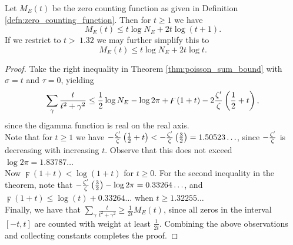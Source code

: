 \begin{corollary}[GRH]\label{cor:zero_density}
Let $M_E(t)$ be the zero counting function as given in Definition \ref{defn:zero_counting_function}. Then for $t \ge 1$ we have
\begin{equation}
M_E(t) \le t\log N_E +2t\log(t+1).
\end{equation}
If we restrict to $t>~1.32$ we may further simplify this to
\begin{equation}
M_E(t) \le t\log N_E +2t\log t.
\end{equation}
\end{corollary}
\begin{proof}
Take the right inequality in Theorem \ref{thm:poisson_sum_bound} with $\sigma = t$ and $\tau=0$, yielding
\begin{equation*}
\sum_{\gamma} \frac{t}{t^2+\gamma^2} \le \frac{1}{2}\log N_E - \log 2\pi + \digamma(1+t) - 2\frac{\zeta^{\prime}}{\zeta}\left(\frac{1}{2}+t\right),
\end{equation*}
since the digamma function is real on the real axis. \\

Note that for $t \ge 1$ we have $-\frac{\zeta^{\prime}}{\zeta}\left(\frac{1}{2}+t\right) < -\frac{\zeta^{\prime}}{\zeta}\left(\frac{3}{2}\right) = 1.50523\ldots$, since $-\frac{\zeta^{\prime}}{\zeta}$ is decreasing with increasing $t$. Observe that this does not exceed $\log 2\pi = 1.83787\ldots$  \\

Now $\digamma(1+t) < \log(1+t)$ for $t\ge0$. For the second inequality in the theorem, note that $-\frac{\zeta^{\prime}}{\zeta}\left(\frac{3}{2}\right) - \log 2\pi = 0.33264\ldots$, and $\digamma(1+t) \le \log(t) + 0.33264\ldots$ when $t\ge 1.32255\ldots$ \\

Finally, we have that $\sum_{\gamma} \frac{t}{t^2+\gamma^2} \ge \frac{1}{2t}M_E(t)$, since all zeros in the interval $[-t,t]$ are counted with weight at least $\frac{1}{2t}$. Combining the above observations and collecting constants completes the proof.
\end{proof}

